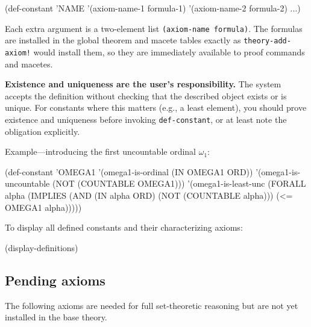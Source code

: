 \documentclass{amsbook}[openany]
\theoremstyle{definition}
\theoremstyle{remark}
\theoremstyle{remark}
\begin{document}
\begin{VNBcode}
(def-constant 'NAME
  '(axiom-name-1 formula-1)
  '(axiom-name-2 formula-2)
  ...)
\end{VNBcode}

Each extra argument is a two-element list \texttt{(axiom-name formula)}.
The formulas are installed in the global theorem and macete tables exactly
as \texttt{theory-add-axiom!} would install them, so they are immediately
available to proof commands and macetes.

\textbf{Existence and uniqueness are the user's responsibility.}  The
system accepts the definition without checking that the described object
exists or is unique.  For constants where this matters (e.g., a least
element), you should prove existence and uniqueness before invoking
\texttt{def-constant}, or at least note the obligation explicitly.

Example---introducing the first uncountable ordinal $\omega_1$:
\begin{VNBcode}
(def-constant 'OMEGA1
  '(omega1-is-ordinal
    (IN OMEGA1 ORD))
  '(omega1-is-uncountable
    (NOT (COUNTABLE OMEGA1)))
  '(omega1-is-least-unc
    (FORALL alpha
      (IMPLIES (AND (IN alpha ORD) (NOT (COUNTABLE alpha)))
               (<= OMEGA1 alpha)))))
\end{VNBcode}

To display all defined constants and their characterizing axioms:
\begin{VNBcode}
(display-definitions)
\end{VNBcode}

\subsection{Pending axioms}
\label{sec:pending-axioms}

The following axioms are needed for full set-theoretic reasoning but are
not yet installed in the base theory.
\end{document}

